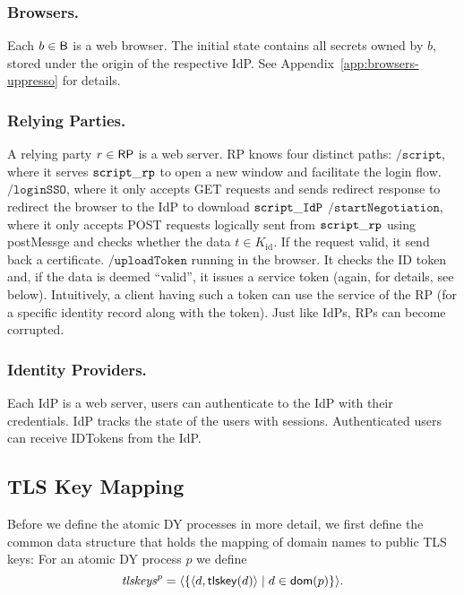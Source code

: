 \documentclass[letterpaper,onecolumn,10pt]{article}
\begin{document}
\subsubsection{Browsers.} Each $b \in \mathsf{B}$ is a web browser. 
The initial state contains all secrets owned by $b$, stored under the origin of the
respective IdP. See Appendix~\ref{app:browsers-uppresso} for details.

\subsubsection{Relying Parties.} 
A relying party $r \in \mathsf{RP}$ is a web server. RP knows four distinct paths: 
$\mathtt{/script}$, where it serves $\mathtt{script\_rp}$ to open a new window 
and facilitate the login flow.
$\mathtt{/loginSSO}$, where it only accepts GET requests and sends 
redirect response to redirect the browser to the IdP to download $\mathtt{script\_IdP}$
$\mathtt{/startNegotiation}$, where it only accepts POST requests logically sent 
from $\mathtt{script\_rp}$ using postMessge and checks whether the data $t\in K_\text{id}$.
If the request valid, it send back a certificate.
$\mathtt{/uploadToken}$ running in the browser. It checks the ID token and, 
if the data is deemed ``valid'', it issues a service token (again, for details, see below). 
Intuitively, a client having such a token can use the service of the RP 
(for a specific identity record along with the token). 
Just like IdPs, RPs can become corrupted.

\subsubsection{Identity Providers.} Each IdP is a web server, 
users can authenticate to the IdP with their credentials. 
IdP tracks the state of the users with sessions. 
Authenticated users can receive IDTokens from the IdP. 


\subsection{TLS Key Mapping}\label{app:common-data-structures}
Before we define the atomic DY processes in more detail, we first
define the common data structure that holds the mapping of domain
names to public TLS keys: For an atomic DY process $p$ we define
\[\mathit{tlskeys}^p = \langle\left\{\langle d, \mathsf{tlskey}(d)\rangle \mid d \in \mathsf{dom}(p)\right\}\rangle.\]
\end{document}
